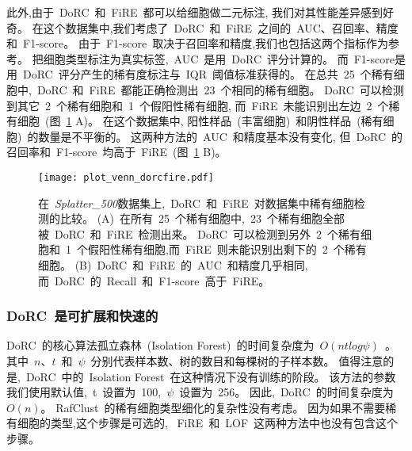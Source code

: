 此外,由于~DoRC~和~FiRE~都可以给细胞做二元标注,
我们对其性能差异感到好奇。
在这个数据集中,我们考虑了~DoRC~和~FiRE~之间的~AUC、召回率、精度和~F1-score。
由于~F1-score~取决于召回率和精度,我们也包括这两个指标作为参考。
把细胞类型标注为真实标签,~AUC~是用~DoRC~评分计算的。
而~F1-score是用~DoRC~评分产生的稀有度标注与~IQR~阈值标准获得的。
在总共~25~个稀有细胞中,~DoRC~和~FiRE~都能正确检测出~23~个相同的稀有细胞。
DoRC~可以检测到其它~2~个稀有细胞和~1~个假阳性稀有细胞,
而~FiRE~未能识别出左边~2~个稀有细胞~(图~\ref{fig:simulate:venn_auc_f1} A)。
在这个数据集中, 阳性样品~(丰富细胞)~和阴性样品~(稀有细胞)~的数量是不平衡的。
这两种方法的~AUC~和精度基本没有变化,
但~DoRC~的召回率和~F1-score~均高于~FiRE~(图~\ref{fig:simulate:venn_auc_f1} B)。
\begin{figure}[!htbp]
    \centering
    \texttt{[image: plot\_venn\_dorcfire.pdf]}
    \caption{
    在~\textit{Splatter\_500}数据集上,~DoRC~和~FiRE~对数据集中稀有细胞检测的比较。
    (A)~在所有~25~个稀有细胞中,~23~个稀有细胞全部被~DoRC~和~FiRE~检测出来。
    DoRC~可以检测到另外~2~个稀有细胞和~1~个假阳性稀有细胞,而~FiRE~则未能识别出剩下的~2~个稀有细胞。
    (B)~DoRC~和~FiRE~的~AUC~和精度几乎相同,而~DoRC~的~Recall~和~F1-score~高于~FiRE。
    }
    \label{fig:simulate:venn_auc_f1}
\end{figure}

\subsubsection{DoRC~是可扩展和快速的}
\label{subsec:scalable} 
DoRC~的核心算法孤立森林~(Isolation Forest)~的时间复杂度为~$O(ntlog\psi)$~\cite{liu2008isolation}。
其中~$n$、$t$~和~$\psi$~分别代表样本数、树的数目和每棵树的子样本数。
值得注意的是,~DoRC~中的~Isolation Forest~在这种情况下没有训练的阶段。
该方法的参数我们使用默认值,~t~设置为~100,~$\psi$~设置为~256。
因此,~DoRC~的时间复杂度为~$O(n)$。
RafClust~的稀有细胞类型细化的复杂性没有考虑。
因为如果不需要稀有细胞的类型,这个步骤是可选的,
~FiRE~和~LOF~这两种方法中也没有包含这个步骤。

